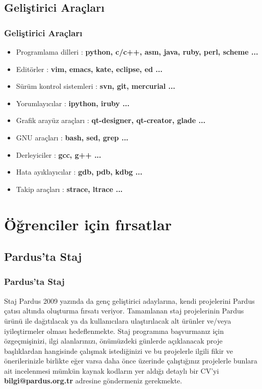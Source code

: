 \documentclass{beamer}
\begin{document}
\subsection{Geliştirici Araçları}
\frame
{
    \frametitle{Geliştirici Araçları}
	\begin{itemize}
        \item Programlama dilleri : \textbf{python, c/c++, asm, java, ruby, perl, scheme ...}
        \item Editörler : \textbf{vim, emacs, kate, eclipse, ed ...}
        \item Sürüm kontrol sistemleri : \textbf{svn, git, mercurial ...}
        \item Yorumlayıcılar : \textbf{ipython, iruby ...}
        \item Grafik arayüz araçları : \textbf{qt-designer, qt-creator, glade ...}
        \item GNU araçları : \textbf{bash, sed, grep ...}
        \item Derleyiciler : \textbf{gcc, g++ ...}
        \item Hata ayıklayıcılar : \textbf{gdb, pdb, kdbg ...}
        \item Takip araçları : \textbf{strace, ltrace ...}
	\end{itemize}
}

\section{Öğrenciler için fırsatlar}

\subsection{Pardus'ta Staj}
\frame
{
    \frametitle{Pardus'ta Staj}
    \begin{block}{Staj}
        Pardus 2009 yazında da genç geliştirici adaylarına, kendi projelerini Pardus çatısı altında oluşturma fırsatı veriyor. Tamamlanan staj projelerinin Pardus ürünü ile dağıtılacak ya da kullanıcılara ulaştırılacak alt ürünler ve/veya iyileştirmeler olması hedeflenmekte.
        Staj programına başvurmanız için özgeçmişinizi, ilgi alanlarınızı, önümüzdeki günlerde açıklanacak proje başlıklardan hangisinde çalışmak istediğinizi ve bu projelerle ilgili fikir ve önerilerinizle birlikte eğer varsa daha önce üzerinde çalıştığınız projelerle bunlara ait incelenmesi mümkün kaynak kodların yer aldığı detaylı bir CV'yi \textbf{bilgi@pardus.org.tr} adresine göndermeniz gerekmekte.
    \end{block}
}
\end{document}
